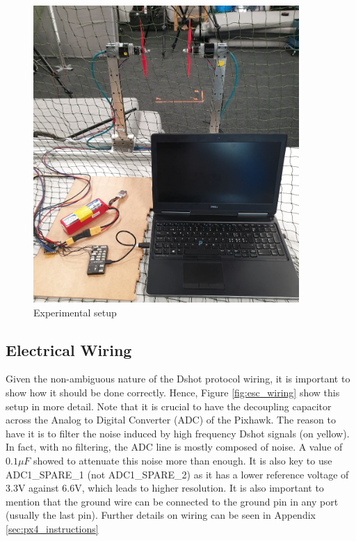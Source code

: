 \begin{figure} 
    \centering
    \includegraphics[width=0.9\textwidth]{images/setup_photo.png}
    \caption{Experimental setup}
    \label{fig:exp_setup}
\end{figure}


\subsection{Electrical Wiring}
Given the non-ambiguous nature of the Dshot protocol wiring, it is important to show how it should be done correctly. Hence, Figure \ref{fig:esc_wiring} show this setup in more detail.
\newline
Note that it is crucial to have the decoupling capacitor across the Analog to Digital Converter (ADC) of the Pixhawk. The reason to have it is to filter the noise induced by high frequency Dshot signals (on yellow). In fact, with no filtering, the ADC line is mostly composed of noise. A value of $0.1\mu F$ showed to attenuate this noise more than enough. It is also key to use ADC1\_SPARE\_1 (not ADC1\_SPARE\_2) as it has a lower reference voltage of 3.3V against 6.6V, which leads to higher resolution.
\newline
It is also important to mention that the ground wire can be connected to the ground pin in any port (usually the last pin). Further details on wiring can be seen in Appendix \ref{sec:px4_instructions}

